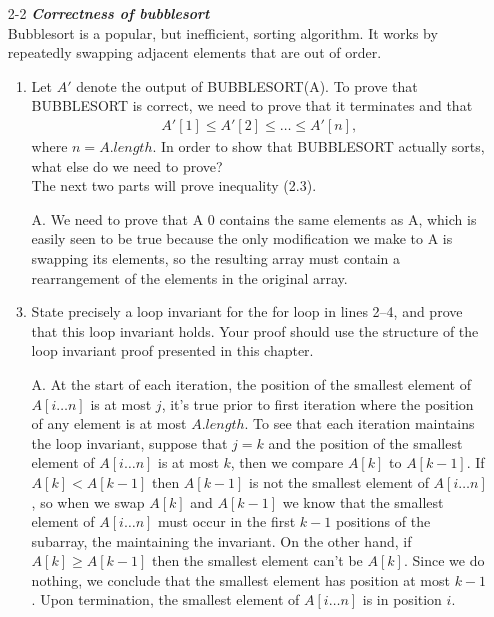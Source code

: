 \documentclass[fontsize=12pt,paper=a4]{book}
\begin{document}
\begin{enumerate}
	\item[2-2]
	\textbf{\textit{Correctness of bubblesort}}\\
	Bubblesort is a popular, but inefficient, sorting algorithm. It works by repeatedly swapping adjacent elements that are out of order.
	
	\begin{enumerate}
		\item Let $A'$ denote the output of BUBBLESORT(A). To prove that BUBBLESORT is correct, we need to prove that it terminates and that
		\begin{align}
		A'[1] \leq A'[2] \leq \dots \leq A'[n],		\label{2.3}
		\end{align}
		where $n=A.length$. In order to show that BUBBLESORT actually sorts, what else do we need to prove?\\
		The next two parts will prove inequality (2.3).
		\item[A.]
		We need to prove that A 0 contains the same elements as A, which is easily seen to be true because the only modification we make to A is swapping its elements, so the resulting array must contain a rearrangement of the elements in the original array.
		
		\item State precisely a loop invariant for the for loop in lines 2–4, and prove that this loop invariant holds. Your proof should use the structure of the loop invariant proof presented in this chapter.
		\item[A.]
		At the start of each iteration, the position of the smallest element of $A[i \dots n]$ is at most $j$, it’s true prior to first iteration where the position of any element is at most $A.length$. To see that each iteration maintains the loop invariant, suppose that $j = k$ and the position of the smallest element of $A[i \dots n]$ is at most $k$, then we compare $A[k]$ to $A[k-1]$. If $A[k] < A[k-1]$ then $A[k-1]$ is not the smallest element of $A[i \dots n]$, so when we swap $A[k]$ and $A[k-1]$ we know that the smallest element of $A[i \dots n]$ must occur in the first $k-1$ positions of the subarray, the maintaining the invariant. On the other hand, if $A[k] \geq A[k-1]$ then the smallest element can’t be $A[k]$. Since we do nothing, we conclude that the smallest element has position at most $k-1$. Upon termination, the smallest element of $A[i \dots n]$ is in position $i$.
		

\end{enumerate}
\end{enumerate}
\end{document}
